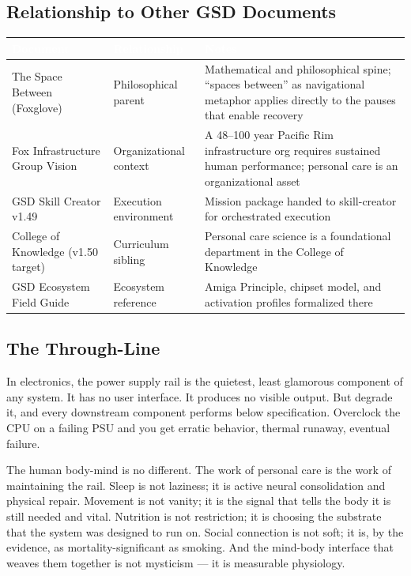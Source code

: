 \documentclass[11pt,letterpaper]{article}
\newcommand{\tableheader}[1]{\textbf{\sffamily\textcolor{white}{#1}}}
\begin{document}
\subsection{Relationship to Other GSD Documents}

\begin{center}
\begin{tabularx}{\textwidth}{L{5cm}L{4cm}X}
\toprule
{}
\tableheader{Document} & \tableheader{Relationship} & \tableheader{Notes} \\
\midrule
The Space Between (Foxglove) & Philosophical parent & Mathematical and philosophical spine; ``spaces between'' as navigational metaphor applies directly to the pauses that enable recovery \\
Fox Infrastructure Group Vision & Organizational context & A 48--100 year Pacific Rim infrastructure org requires sustained human performance; personal care is an organizational asset \\
GSD Skill Creator v1.49 & Execution environment & Mission package handed to skill-creator for orchestrated execution \\
College of Knowledge (v1.50 target) & Curriculum sibling & Personal care science is a foundational department in the College of Knowledge \\
GSD Ecosystem Field Guide & Ecosystem reference & Amiga Principle, chipset model, and activation profiles formalized there \\
\bottomrule
\end{tabularx}
\end{center}

\subsection{The Through-Line}

In electronics, the power supply rail is the quietest, least glamorous component of any system. It has no user interface. It produces no visible output. But degrade it, and every downstream component performs below specification. Overclock the CPU on a failing PSU and you get erratic behavior, thermal runaway, eventual failure.

The human body-mind is no different. The work of personal care is the work of maintaining the rail. Sleep is not laziness; it is active neural consolidation and physical repair. Movement is not vanity; it is the signal that tells the body it is still needed and vital. Nutrition is not restriction; it is choosing the substrate that the system was designed to run on. Social connection is not soft; it is, by the evidence, as mortality-significant as smoking. And the mind-body interface that weaves them together is not mysticism --- it is measurable physiology.
\end{document}
